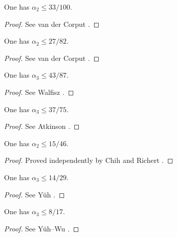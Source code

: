 \begin{lemma}\label{vdc-alpha-2}
One has $\alpha_2 \le 33/100$.
\end{lemma}
\begin{proof}
See van der Corput \cite{van_der_corput_verscharfung_1922}.
\end{proof}


\begin{lemma}\label{vdc-alpha-2}
One has $\alpha_2 \le 27/82$.
\end{lemma}
\begin{proof}
See van der Corput \cite{van_der_corput_zum_1928}.
\end{proof}

\begin{lemma}\label{walfisz-alpha-3}
One has $\alpha_3 \le 43/87$.
\end{lemma}
\begin{proof}
See Walfisz \cite{walfisz_uber_1926}.
\end{proof}

\begin{lemma}\label{atkinson-alpha-3}
One has $\alpha_3 \le 37/75$.
\end{lemma}
\begin{proof}
See Atkinson \cite{atkinson_divisor_1941}.
\end{proof}


\begin{lemma}\label{richert-alpha-2}
One has $\alpha_2 \le 15/46$.
\end{lemma}
\begin{proof}
Proved independently by Chih \cite{chih_on_1950} and Richert \cite{richert_verschrfung_1953}.
\end{proof}

\begin{lemma}\label{yuh-alpha-3}
One has $\alpha_3 \le 14/29$.
\end{lemma}
\begin{proof}
See Y\"{u}h \cite{yuh_divisor_1958}.
\end{proof}

\begin{lemma}\label{yuh-wu-alpha-3}
One has $\alpha_3 \le 8/17$.
\end{lemma}
\begin{proof}
See Y\"{u}h--Wu \cite{yuh_wu_divisor_1962}.
\end{proof}

